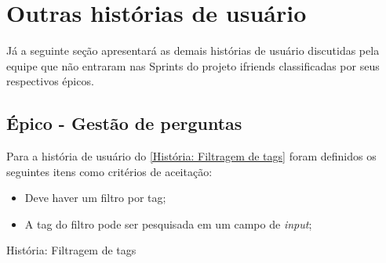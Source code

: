 \chapter{Outras histórias de usuário}
\label{outras historias de usuario}
Já a seguinte seção apresentará as demais histórias de usuário discutidas pela equipe que não entraram nas \glspl{Sprint} do projeto \gls{ifriends} classificadas por seus respectivos épicos.

\section{Épico - Gestão de perguntas}
\label{outro_gestão_perguntas}
Para a história de usuário do \autoref{História: Filtragem de tags} foram definidos os seguintes itens como critérios de aceitação:

\begin{itemize}
\item Deve haver um filtro por tag;
\item A tag do filtro pode ser pesquisada em um campo de \textit{input}; 
\end{itemize}

\def\arraystretch{2}
\begin{quadro}[htb]
\centering
\ABNTEXfontereduzida
\caption[História: Filtragem de tags]{História: Filtragem de tags}
\label{História: Filtragem de tags}
\end{quadro}
\FloatBarrier 
